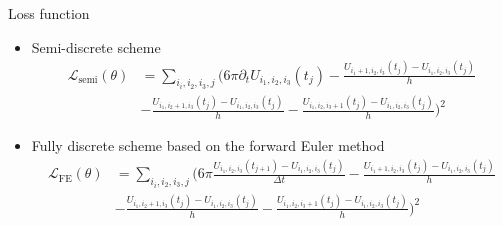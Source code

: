 \documentclass[aspectratio=169]{beamer}
\begin{document}
\begin{frame}{Loss function}

\begin{itemize}
	\item Semi-discrete scheme
	\begin{equation*}
	\begin{aligned}
	\mathcal{L}_{\mathrm{semi}}(\theta) &=  \sum_{i_i,i_2,i_3,j}\bigg(6\pi \partial_t U_{i_1,i_2,i_3}(t_j)  - \frac{U_{i_1+1,i_2,i_3}(t_j) -U_{i_1,i_2,i_3}(t_j)}{h} \\ 
	& - \frac{U_{i_1,i_2+1,i_3}(t_j) -U_{i_1,i_2,i_3}(t_j)}{h} - \frac{U_{i_1,i_2,i_3+1}(t_j) - U_{i_1,i_2,i_3}(t_j)}{h}  \bigg)^2
	\end{aligned}
	\end{equation*}
	\item Fully discrete scheme based on the forward Euler method
	\begin{equation*}
	\begin{aligned}
	\mathcal{L}_{\mathrm{FE}}(\theta) &=\sum_{i_i,i_2,i_3,j}\bigg(6\pi \frac{ U_{i_1,i_2,i_3}(t_{j+1}) - U_{i_1,i_2,i_3}(t_j)}{\Delta t} - \frac{U_{i_1+1,i_2,i_3}(t_j) -U_{i_1,i_2,i_3}(t_j)}{h} \\  
	& - \frac{U_{i_1,i_2+1,i_3}(t_j)  -U_{i_1,i_2,i_3}(t_j)}{h}  - \frac{U_{i_1,i_2,i_3+1}(t_j)-U_{i_1,i_2,i_3}(t_j)}{h}  \bigg)^2
	\end{aligned}
	\end{equation*}
\end{itemize}
\end{frame}
\end{document}
